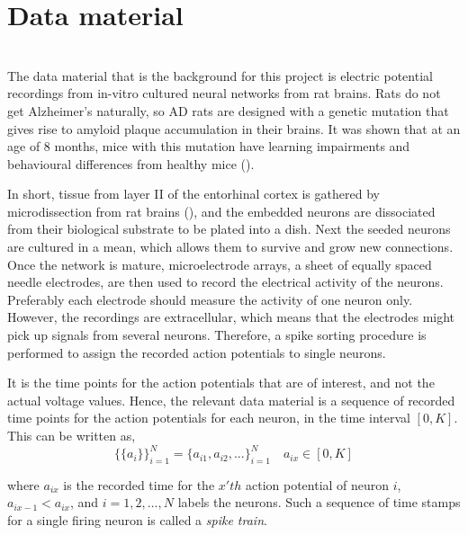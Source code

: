 \section{Data material}

\label{Lab}\\
The data material that is the background for this project is electric potential recordings from in-vitro cultured neural networks from rat brains. Rats do not get Alzheimer's naturally, so AD rats are designed with a genetic mutation that gives rise to amyloid plaque accumulation in their brains. It was shown that at an age of 8 months, mice with this mutation have learning impairments and behavioural differences from healthy mice (\cite{Radde}). 

In short, tissue from layer II of the entorhinal cortex is gathered by microdissection from rat brains (\cite{Katrine}), and the embedded neurons are dissociated from their biological substrate to be plated into a dish. Next the seeded neurons are cultured in a mean, which allows them to survive and grow new connections. Once the network is mature, microelectrode arrays, a sheet of equally spaced needle electrodes, are then used to record the electrical activity of the neurons. Preferably each electrode should measure the activity of one neuron only. However, the recordings are extracellular, which means that the electrodes might pick up signals from several neurons. Therefore, a spike sorting procedure is performed to assign the recorded action potentials to single neurons. 

It is the time points for the action potentials that are of interest, and not the actual voltage values. Hence, the relevant data material is a sequence of recorded time points for the action potentials for each neuron, in the time interval $[0,K]$. This can be written as, 
\begin{equation}
\label{eq:AP}
    \{\{a_i\}\}_{i=1}^{N} = \{a_{i1}, a_{i2}, ...\}_{i=1}^{N} \quad a_{ix} \in [0,K]
\end{equation}

where $a_{ix}$ is the recorded time for the $x'th$ action potential of neuron $i$, $a_{ix-1} < a_{ix}$, and $i=1,2,...,N$ labels the neurons. Such a sequence of time stamps for a single firing neuron is called a \textit{spike train}.\\






\cleardoublepage